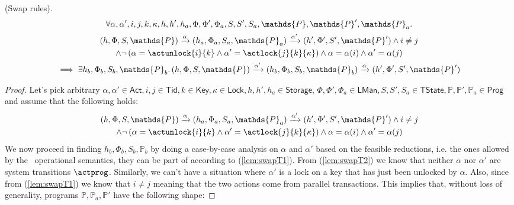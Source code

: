\begin{lem}
	(Swap rules).
	\begin{gather*}
		\forall
			\alpha, \alpha',
			i, j, k, \kappa,
			h, h', h_a,
			\Phi, \Phi', \Phi_a,
			S, S', S_a,
			\mathds{P}, \mathds{P}', \mathds{P}_a
		\ldotp \\
		(h, \Phi, S, \mathds{P})
			\xrightarrow{\alpha}
		(h_a, \Phi_a, S_a, \mathds{P}_a)
			\xrightarrow{\alpha'}
		(h', \Phi', S', \mathds{P}')
			\land
			i \neq j \\
			\land
		\lnot \left( \alpha = \actunlock{i}{k}
			\land
		\alpha' = \actlock{j}{k}{\kappa} \right)
			\land
		\alpha = \alpha(i)
			\land
		\alpha' = \alpha(j) \\
			\implies
		\exists h_b, \Phi_b, S_b, \mathds{P}_b \ldotp
		(h, \Phi, S, \mathds{P})
			\xrightarrow{\alpha'}
		(h_b, \Phi_b, S_b, \mathds{P}_b)
			\xrightarrow{\alpha}
		(h', \Phi', S', \mathds{P}')
	\end{gather*}
	\begin{proof}
	Let's pick arbitrary $\alpha, \alpha' \in \mathsf{Act}, i, j \in \mathsf{Tid}, k \in \mathsf{Key}, \kappa \in \mathsf{Lock}, h, h', h_a \in \mathsf{Storage}$, $\Phi, \Phi', \Phi_a \in \mathsf{LMan}, S, S', S_a \in \mathsf{TState}, \mathds{P}, \mathds{P}', \mathds{P}_a \in \mathsf{Prog}$ and assume that the following holds:
	\begin{gather}
		\label{lem:swapT1}
		(h, \Phi, S, \mathds{P})
			\xrightarrow{\alpha}
		(h_a, \Phi_a, S_a, \mathds{P}_a)
			\xrightarrow{\alpha'}
		(h', \Phi', S', \mathds{P}')
			\land
			i \neq j \\
			\land
		\label{lem:swapT2}
		\lnot \left( \alpha = \actunlock{i}{k}
			\land
		\alpha' = \actlock{j}{k}{\kappa} \right)
			\land
		\alpha = \alpha(i)
			\land
		\alpha' = \alpha(j)
	\end{gather}
	We now proceed in finding $h_b, \Phi_b, S_b, \mathds{P}_b$ by doing a case-by-case analysis on $\alpha$ and $\alpha'$ based on the feasible reductions, i.e. the ones allowed by the \tpl\ operational semantics, they can be part of according to (\ref{lem:swapT1}). From (\ref{lem:swapT2}) we know that neither $\alpha$ nor $\alpha'$ are system transitions $\actprog$. Similarly, we can't have a situation where $\alpha'$ is a lock on a key that has just been unlocked by $\alpha$. Also, since from (\ref{lem:swapT1}) we know that $i \neq j$ meaning that the two actions come from parallel transactions. This implies that, without loss of generality, programs $\mathds{P}, \mathds{P}_a, \mathds{P}'$ have the following shape:

\end{proof}
\end{lem}
